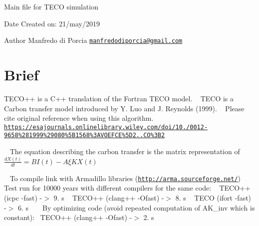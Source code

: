 Main file for T\+E\+CO simulation\begin{DoxyDate}{Date}
Created on\+: 21/may/2019 
\end{DoxyDate}
\begin{DoxyAuthor}{Author}
Manfredo di Porcia \href{mailto:manfredodiporcia@gmail.com}{\tt manfredodiporcia@gmail.\+com}
\end{DoxyAuthor}
\hypertarget{index_Brief}{}\section{Brief}\label{index_Brief}
T\+E\+C\+O++ is a C++ translation of the Fortran T\+E\+CO model. ~\newline
T\+E\+CO is a Carbon transfer model introduced by Y. Luo and J. Reynolds (1999). ~\newline
Please cite original reference when using this algorithm. ~\newline
\href{https://esajournals.onlinelibrary.wiley.com/doi/10.1890/0012-9658%281999%29080%5B1568%3AVOEFCE%5D2.0.CO%3B2}{\tt https\+://esajournals.\+onlinelibrary.\+wiley.\+com/doi/10.\+1890/0012-\/9658\%281999\%29080\%5\+B1568\%3\+A\+V\+O\+E\+F\+C\+E\%5\+D2.\+0.\+C\+O\%3\+B2}

~\newline
 The equation describing the carbon transfer is the matrix representation of ~\newline
~\newline
 $ \frac{dX(t)}{dt} = BI(t) - A \xi KX(t) $

~\newline
 To compile link with Armadillo libraries (\href{http://arma.sourceforge.net/}{\tt http\+://arma.\+sourceforge.\+net/}) ~\newline
~\newline
 Test run for 10000 years with different compilers for the same code\+: ~\newline
T\+E\+C\+O++ (icpc -\/fast) -\/$>$ 9. s ~\newline
T\+E\+C\+O++ (clang++ -\/\+Ofast) -\/$>$ 8. s ~\newline
T\+E\+CO (ifort -\/fast) -\/$>$ 6. s ~\newline
~\newline
 By optimizing code (avoid repeated computation of A\+K\+\_\+inv which is constant)\+:~\newline
 T\+E\+C\+O++ (clang++ -\/\+Ofast) -\/$>$ 2. s ~\newline

